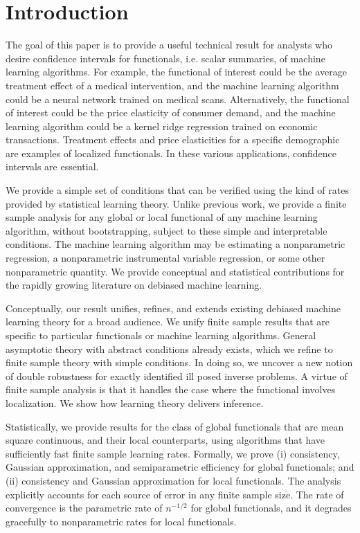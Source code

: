 \section{Introduction}\label{sec:intro}

The goal of this paper is to provide a useful technical result for analysts who desire confidence intervals for functionals, i.e. scalar summaries, of machine learning algorithms. For example, the functional of interest could be the average treatment effect of a medical intervention, and the machine learning algorithm could be a neural network trained on medical scans. Alternatively, the functional of interest could be the price elasticity of consumer demand, and the machine learning algorithm could be a kernel ridge regression trained on economic transactions. Treatment effects and price elasticities for a specific demographic are examples of localized functionals. In these various applications, confidence intervals are essential.

We provide a simple set of conditions that can be verified using the kind of rates provided by statistical learning theory. Unlike previous work, we provide a finite sample analysis for any global or local functional of any machine learning algorithm, without bootstrapping, subject to these simple and interpretable conditions. The machine learning algorithm may be estimating a nonparametric regression, a nonparametric instrumental variable regression, or some other nonparametric quantity. We provide conceptual and statistical contributions for the rapidly growing literature on debiased machine learning.

Conceptually, our result unifies, refines, and extends existing debiased machine learning theory for a broad audience. We unify finite sample results that are specific to particular functionals or machine learning algorithms. General asymptotic theory with abstract conditions already exists, which we refine to finite sample theory with simple conditions. In doing so, we uncover a new notion of double robustness for exactly identified ill posed inverse problems. A virtue of finite sample analysis is that it handles the case where the functional involves localization. We show how learning theory delivers inference.

Statistically, we provide results for the class of global functionals that are mean square continuous, and their local counterparts, using algorithms that have sufficiently fast finite sample learning rates. Formally, we prove (i) consistency, Gaussian approximation, and semiparametric efficiency for global functionals; and (ii) consistency and Gaussian approximation for local functionals. The analysis explicitly accounts for each source of error in any finite sample size. The rate of convergence is the parametric rate of $n^{-1/2}$ for global functionals, and it degrades gracefully to nonparametric rates for local functionals.